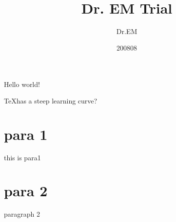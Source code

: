 \documentclass[a4 paper, 11pt,fleqn,titlepage]{article}
\title{Dr. EM Trial}
\author{Dr.EM}
\date{200808}
\begin{document}
\maketitle

Hello world!


\TeX has a steep learning curve?


\tableofcontents
\section{para 1}
this is para1

\section{para 2}
paragraph 2
\end{document}
